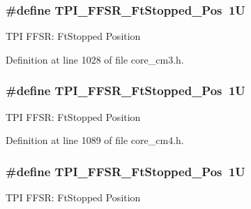 \subsubsection[{\texorpdfstring{T\+P\+I\+\_\+\+F\+F\+S\+R\+\_\+\+Ft\+Stopped\+\_\+\+Pos}{TPI_FFSR_FtStopped_Pos}}]{\setlength{\rightskip}{0pt plus 5cm}\#define T\+P\+I\+\_\+\+F\+F\+S\+R\+\_\+\+Ft\+Stopped\+\_\+\+Pos~1U}\hypertarget{group___c_m_s_i_s___t_p_i_gaedf31fd453a878021b542b644e2869d2}{}\label{group___c_m_s_i_s___t_p_i_gaedf31fd453a878021b542b644e2869d2}
T\+PI F\+F\+SR\+: Ft\+Stopped Position 

Definition at line 1028 of file core\+\_\+cm3.\+h.

\subsubsection[{\texorpdfstring{T\+P\+I\+\_\+\+F\+F\+S\+R\+\_\+\+Ft\+Stopped\+\_\+\+Pos}{TPI_FFSR_FtStopped_Pos}}]{\setlength{\rightskip}{0pt plus 5cm}\#define T\+P\+I\+\_\+\+F\+F\+S\+R\+\_\+\+Ft\+Stopped\+\_\+\+Pos~1U}\hypertarget{group___c_m_s_i_s___t_p_i_gaedf31fd453a878021b542b644e2869d2}{}\label{group___c_m_s_i_s___t_p_i_gaedf31fd453a878021b542b644e2869d2}
T\+PI F\+F\+SR\+: Ft\+Stopped Position 

Definition at line 1089 of file core\+\_\+cm4.\+h.

\subsubsection[{\texorpdfstring{T\+P\+I\+\_\+\+F\+F\+S\+R\+\_\+\+Ft\+Stopped\+\_\+\+Pos}{TPI_FFSR_FtStopped_Pos}}]{\setlength{\rightskip}{0pt plus 5cm}\#define T\+P\+I\+\_\+\+F\+F\+S\+R\+\_\+\+Ft\+Stopped\+\_\+\+Pos~1U}\hypertarget{group___c_m_s_i_s___t_p_i_gaedf31fd453a878021b542b644e2869d2}{}\label{group___c_m_s_i_s___t_p_i_gaedf31fd453a878021b542b644e2869d2}
T\+PI F\+F\+SR\+: Ft\+Stopped Position 

